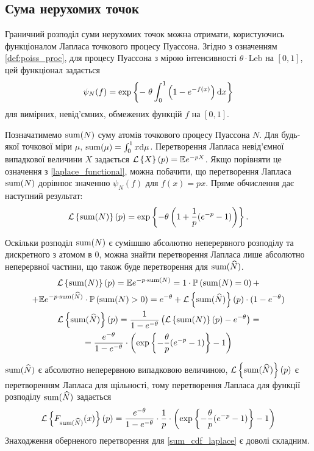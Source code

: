 \subsection{Сума нерухомих точок}
Граничний розподіл суми нерухомих точок можна отримати, користуючись функціоналом Лапласа точкового процесу Пуассона.
Згідно з означенням \ref{def:poiss_proc}, для процесу Пуассона з мірою інтенсивності 
$\theta \cdot \mathrm{Leb}$ на $[0, 1]$, цей функціонал задається
\begin{equation}\label{laplace_functional}
    \psi_N(f) = \exp\left\{ - \; \theta \int_0^1 \left(1 - e^{-f(x)}\right) \mathrm{d} x\right\}
\end{equation}
для вимірних, невід'ємних, обмежених функцій $f$ на $[0, 1]$.

Позначатимемо $\operatorname{sum}(N)$ суму атомів точкового процесу Пуассона $N$. 
Для будь-якої точкової міри $\mu$, 
$\operatorname{sum}(\mu) = \int_0^1 x \mathrm{d}\mu$. 
Перетворення Лапласа невід'ємної випадкової величини $X$ задається
$\mathcal{L}\left\{X\right\}(p) = \mathbb{E} e^{-pX}$. 
Якщо порівняти це означення з \eqref{laplace_functional}, можна побачити, що
перетворення Лапласа $\operatorname{sum}(N)$ дорівнює значенню $\psi_N(f)$ для $f(x) = px$.
Пряме обчислення дає наступний результат:
\begin{gather}
    \mathcal{L}\left\{\operatorname{sum}(N)\right\}(p) = 
    \exp\left\{- \theta \left( 1 + \frac{1}{p}(e^{-p} - 1)\right) \right\}.
\end{gather}

Оскільки розподіл $\operatorname{sum}(N)$ є сумішшю абсолютно неперервного розподілу та
дискретного з атомом в 0, можна знайти перетворення Лапласа
лише абсолютно неперервної частини, що також буде перетворення для
$\operatorname{sum}(\widehat{N})$.
\begin{gather*}
    \mathcal{L}\left\{\operatorname{sum}(N)\right\}(p) = \mathbb{E} e^{-p\cdot\operatorname{sum}(N)} = 
    1 \cdot \mathbb{P}\left(\operatorname{sum}(N) = 0\right) + \\ +
    \mathbb{E} e^{-p\cdot\operatorname{sum}(\widehat{N})} \cdot \mathbb{P}\left(\operatorname{sum}(N) > 0\right) =
    e^{-\theta} + \mathcal{L}\left\{\operatorname{sum}(\widehat{N})\right\}(p) \cdot (1-e^{-\theta})
    \\
    \mathcal{L}\left\{\operatorname{sum}(\widehat{N})\right\}(p) = \frac{1}{1 - e^{-\theta}}
    \left(\mathcal{L}\left\{\operatorname{sum}(N)\right\}(p) - e^{-\theta}\right) = \\ =
    \frac{e^{-\theta}}{1 - e^{-\theta}} \cdot 
    \left(\exp\left\{- \frac{\theta}{p}(e^{-p} - 1) \right\} - 1\right)
\end{gather*}

$\operatorname{sum}(\widehat{N})$ є абсолютно неперервною випадковою величиною,
$\mathcal{L}\left\{\operatorname{sum}(\widehat{N})\right\}(p)$ є перетворенням Лапласа для щільності, тому
перетворення Лапласа для функції розподілу $\operatorname{sum}(\widehat{N})$
задається 
\begin{equation}\label{sum_cdf_laplace}
    \mathcal{L}\left\{F_{\operatorname{sum}(\widehat{N})}(x)\right\}(p) = 
    \frac{e^{-\theta}}{1 - e^{-\theta}} \cdot \frac{1}{p} \cdot
    \left(\exp\left\{- \frac{\theta}{p}(e^{-p} - 1) \right\} - 1\right)
\end{equation}
Знаходження оберненого перетворення для \eqref{sum_cdf_laplace}
є доволі складним.


